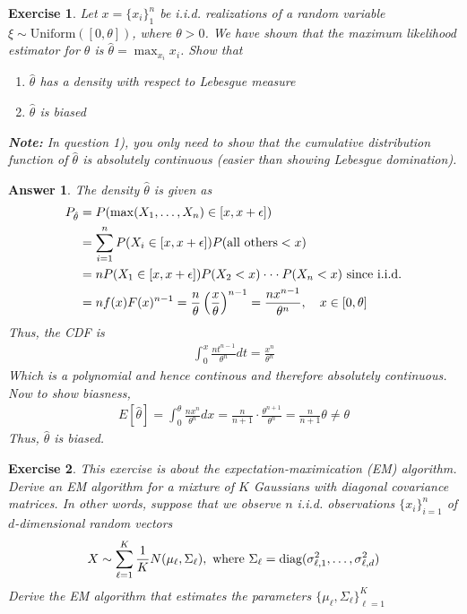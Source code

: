 \documentclass[12pt]{article}
\theoremstyle{colon}
\newtheorem{exercise}{Exercise}
\newtheorem*{answer}{Answer}
\begin{document}
\clearpage

\begin{exercise}
  Let $x = \{ x_i \}_1^n$ be i.i.d. realizations of a random variable $\xi \sim \text{Uniform}([0, \theta])$, where $\theta > 0$. We have shown that the maximum likelihood estimator for $\theta$ is $\hat{\theta} = \max_{x_i} x_i$. Show that
  \begin{enumerate}[label=\arabic*)]
    \item $\hat{\theta}$ has a density with respect to Lebesgue measure
    \item $\hat{\theta}$ is biased
  \end{enumerate}
  \textbf{Note: } In question 1), you only need to show that the cumulative distribution function of $\hat{\theta}$ is absolutely continuous (easier than showing Lebesgue domination).
\end{exercise}

\begin{answer}
  The density $\hat{\theta}$ is given as
  \begin{align*}
    P_{\hat{\theta}} &= P(\max (X_1,\mathellipsis,X_n) \in [x, x + \epsilon]) \\
    &= \sum_{i=1}^n P(X_i \in [x, x + \epsilon]) P(\text{all others} < x) \\
    &= n P(X_1 \in [x, x + \epsilon])P(X_2 < x) \cdot \cdot \cdot P(X_n < x) \text{ since i.i.d.} \\
    &= n f(x) F(x)^{n-1} = \frac{n}{\theta} \left( \frac{x}{\theta} \right)^{n-1} = \frac{nx^{n-1}}{\theta^n}, \quad x \in [0, \theta]
  \end{align*}
  Thus, the CDF is
  \begin{gather*}
    \int_0^x \frac{nt^{n-1}}{\theta^n} dt = \frac{x^n}{\theta^n}
  \end{gather*}
  Which is a polynomial and hence continous and therefore absolutely continuous.
  Now to show biasness,
  \begin{gather*}
    E[\hat{\theta}] = \int_0^\theta \frac{nx^n}{\theta^n} dx = \frac{n}{n+1} \cdot \frac{\theta^{n+1}}{\theta^n} = \frac{n}{n+1} \theta \neq \theta
  \end{gather*}
  Thus, $\hat{\theta}$ is biased.
\end{answer}

\clearpage

\begin{exercise}
  This exercise is about the expectation-maximication (EM) algorithm. Derive an EM algorithm for a mixture of $K$ Gaussians with diagonal covariance matrices. In other words, suppose that we observe $n$ i.i.d. observations $\{ x_i \}_{i=1}^n$ of $d$-dimensional random vectors
  \begin{gather*}
    X \sim \sum_{\ell = 1}^K \frac{1}{K} N(\mu_\ell, \Sigma_\ell), \text{ where } \Sigma_\ell = \text{diag}(\sigma_{\ell,1}^2, \mathellipsis, \sigma_{\ell,d}^2)
  \end{gather*}
  Derive the EM algorithm that estimates the parameters $\{ \mu_\ell, \Sigma_\ell \}_{\ell=1}^K$
\end{exercise}
\end{document}
